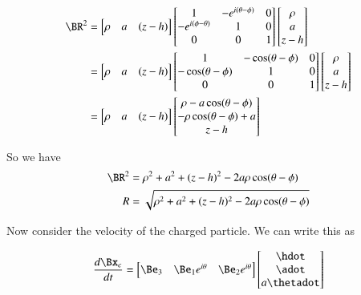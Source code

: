\begin{align*}
\BR^2 
&=
\begin{bmatrix}
\rho &
a & 
(z - h)
\end{bmatrix}
\begin{bmatrix}
1 & - e^{i(\theta-\phi)} & 0 \\
- e^{i(\phi -\theta)} & 1 & 0 \\
0 & 0 & 1 \\
\end{bmatrix}
\begin{bmatrix}
\rho \\
a \\
z - h
\end{bmatrix} \\
&=
\begin{bmatrix}
\rho &
a & 
(z - h)
\end{bmatrix}
\begin{bmatrix}
1 & - \cos(\theta-\phi) & 0 \\
- \cos(\theta -\phi) & 1 & 0 \\
0 & 0 & 1 \\
\end{bmatrix}
\begin{bmatrix}
\rho \\
a \\
z - h
\end{bmatrix} \\
&=
\begin{bmatrix}
\rho &
a & 
(z - h)
\end{bmatrix}
\begin{bmatrix}
\rho - a \cos(\theta - \phi) \\
- \rho \cos(\theta - \phi) + a \\
z - h
\end{bmatrix}
\end{align*}

So we have
\begin{align}\label{eqn:matrixVectorPotentials:210}
\BR^2 &= \rho^2 + a^2 + (z -h)^2 - 2 a \rho \cos(\theta - \phi) \\
R &= \sqrt{\rho^2 + a^2 + (z -h)^2 - 2 a \rho \cos(\theta - \phi)}
\end{align}

Now consider the velocity of the charged particle.  We can write this as

\begin{equation}\label{eqn:matrixVectorPotentials:230}
\frac{d \Bx_c}{dt} = 
\begin{bmatrix}
\Be_3 & \Be_1 e^{i \theta} & \Be_2 e^{i\theta}
\end{bmatrix}
\begin{bmatrix}
\hdot \\
\adot \\
a \thetadot
\end{bmatrix}
\end{equation}

